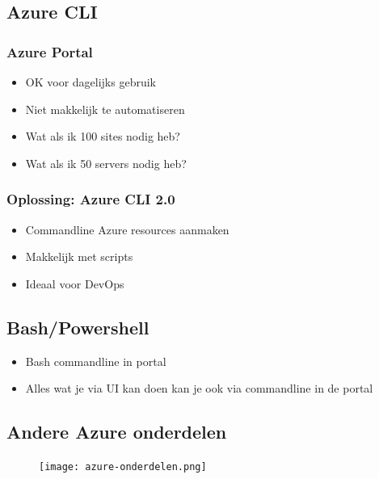 \documentclass{article}
\begin{document}
\subsection{Azure CLI}

\subsubsection{Azure Portal}

\begin{itemize}
    \item OK voor dagelijks gebruik
    \item Niet makkelijk te automatiseren
    \item Wat als ik 100 sites nodig heb?
    \item Wat als ik 50 servers nodig heb?
\end{itemize}

\subsubsection{Oplossing: Azure CLI 2.0}
\begin{itemize}
    \item Commandline Azure resources aanmaken
    \item Makkelijk met scripts
    \item Ideaal voor DevOps
\end{itemize}

\subsection{Bash/Powershell}

\begin{itemize}
    \item Bash commandline in portal
    \item Alles wat je via UI kan doen kan je ook via commandline in de portal
\end{itemize}

\subsection{Andere Azure onderdelen}
\begin{figure}[H]
    \centering
    \texttt{[image: azure-onderdelen.png]}
    \caption{}
\end{figure}
\end{document}
